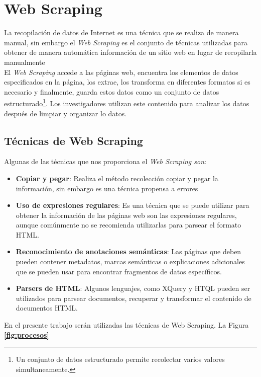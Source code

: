

\section{Web Scraping}
La recopilación de datos de Internet es una técnica que se realiza de manera manual, sin embargo 
el \textit{Web Scraping} es el conjunto de técnicas utilizadas para obtener de manera automática información de 
un sitio web en lugar de recopilarla manualmente %
\\
El \textit{Web Scraping} accede a las páginas web, encuentra los elementos de datos especificados en la 
página, los extrae, los transforma en diferentes formatos si es necesario y finalmente, guarda 
estos datos como un conjunto de datos estructurado\footnote{Un conjunto de datos estructurado permite recolectar 
varios valores simultaneamente.}. Los investigadores utilizan este contenido para analizar los datos 
después de limpiar y organizar lo datos.
\subsection{Técnicas de Web Scraping}

Algunas de las técnicas que nos proporciona el \textit{Web Scraping son}:
\begin{itemize}
    \item \textbf{Copiar y pegar}: Realiza el método recolección copiar y pegar la información, 
    sin embargo es una técnica propensa a errores
    \item \textbf{Uso de expresiones regulares}: Es una técnica que se puede utilizar para obtener la información 
    de las páginas web son las expresiones regulares, aunque comúnmente no se recomienda utilizarlas para parsear el formato HTML.
    \item \textbf{Reconocimiento de anotaciones semánticas}: Las páginas que deben pueden contener metadatos, 
    marcas semánticas o explicaciones adicionales que se pueden usar para encontrar fragmentos de datos específicos.
    \item \textbf{Parsers de HTML}: Algunos lenguajes, como XQuery y HTQL pueden ser utilizados para parsear documentos, recuperar 
    y transformar el contenido de documentos HTML.
\end{itemize}
En el presente trabajo serán utilizadas las técnicas de Web Scraping.
La Figura \textbf{\ref{fig:procesos}}

